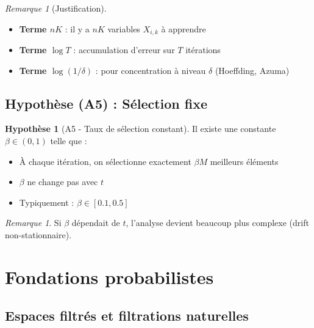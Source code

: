 \documentclass[12pt,a4paper]{article}
\theoremstyle{definition}
\newtheorem{hypothesis}{Hypothèse}
\theoremstyle{remark}
\newtheorem{remark}[theorem]{Remarque}
\begin{document}
	\begin{remark}[Justification]
		\begin{itemize}
			\item \textbf{Terme $nK$} : il y a $nK$ variables $X_{i,k}$ à apprendre
			\item \textbf{Terme $\log T$} : accumulation d'erreur sur $T$ itérations
			\item \textbf{Terme $\log(1/\delta)$} : pour concentration à niveau $\delta$ (Hoeffding, Azuma)
		\end{itemize}
	\end{remark}
	
	\subsection{Hypothèse (A5) : Sélection fixe}
	
	\begin{hypothesis}[A5 - Taux de sélection constant]\label{hyp:A5}
		Il existe une constante $\beta \in (0,1)$ telle que :
		\begin{itemize}
			\item À chaque itération, on sélectionne exactement $\beta M$ meilleurs éléments
			\item $\beta$ ne change pas avec $t$
			\item Typiquement : $\beta \in [0.1, 0.5]$
		\end{itemize}
	\end{hypothesis}
	
	\begin{remark}
		Si $\beta$ dépendait de $t$, l'analyse devient beaucoup plus complexe (drift non-stationnaire).
	\end{remark}
	
	\section{Fondations probabilistes}
	
	\subsection{Espaces filtrés et filtrations naturelles}
	
\end{document}
